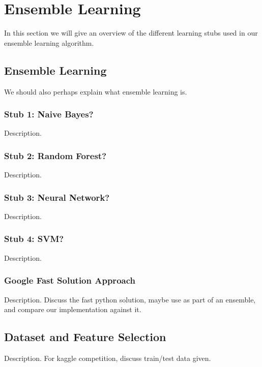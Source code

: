 \documentclass{article} %
\begin{document}
\section{Ensemble Learning}

In this section we will give an overview of the different learning stubs used in our ensemble learning algorithm.

\subsection{Ensemble Learning}

We should also perhaps explain what ensemble learning is.

\subsubsection{Stub 1: Naive Bayes?}

Description.

\subsubsection{Stub 2: Random Forest?}

Description.

\subsubsection{Stub 3: Neural Network?}

Description.

\subsubsection{Stub 4: SVM?}

Description.

\subsubsection{Google Fast Solution Approach}

Description. Discuss the fast python solution, maybe use as part of an ensemble, and compare our implementation against it.

\subsection{Dataset and Feature Selection} %

Description. For kaggle competition, discuss train/test data given.
\end{document}
